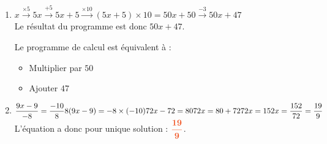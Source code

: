 \documentclass[a4paper,11pt]{article}
\begin{document}
\begin{seance}{}
\begin{enumerate}
\medskip
Il faut donc appliquer une hausse d'environ $66{,}67\,\%$ pour revenir au niveau de départ.


\item  $x\xrightarrow{\times  5} 5x\xrightarrow{+5}5x+5 \xrightarrow{\times  10}(5x+5)\times  10=50x+50\xrightarrow{-3}50x+47$\\Le résultat du programme est donc $50x+47$.

\medskip
Le programme de calcul est équivalent à :	\begin{itemize}
		\item Multiplier par $50$
		\item Ajouter $47$
	\end{itemize}


\item $
\dfrac{9x-9}{-8}=\dfrac{-10}{8}\\
8( 9x-9 )=-8 \times (-10)\\
72x-72=80\\
72x=80+72\\
72x=152\\
x=\dfrac{152}{72}=\dfrac{19}{9}
$\\
L'équation a donc pour unique solution : ${\color[HTML]{f15929}\boldsymbol{\dfrac{19}{9}}}$.

\end{enumerate}
\end{seance}
\end{document}

